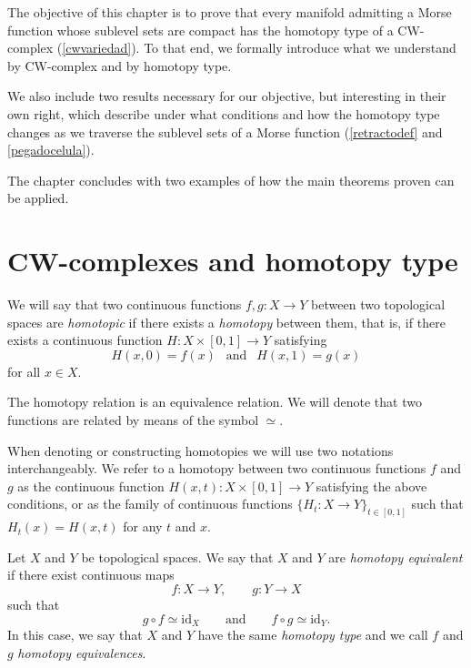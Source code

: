 
The objective of this chapter is to prove that every manifold admitting a Morse function whose sublevel sets are compact has the homotopy type of a CW-complex (\ref{cwvariedad}). To that end, we formally introduce what we understand by CW-complex and by homotopy type.

We also include two results necessary for our objective, but interesting in their own right, which describe under what conditions and how the homotopy type changes as we traverse the sublevel sets of a Morse function (\ref{retractodef} and \ref{pegadocelula}).

The chapter concludes with two examples of how the main theorems proven can be applied.

\bigskip

\section{CW-complexes and homotopy type}

We will say that two continuous functions $f, g:X\to Y$ between two topological spaces are \textit{homotopic} if there exists a \textit{homotopy} between them, that is, if there exists a continuous function $H:X\times [0,1]\to Y$ satisfying
\begin{equation*}
    H(x,0)=f(x) ~~\text{ and }~~ H(x,1)=g(x)
\end{equation*}
for all $x\in X$.

The homotopy relation is an equivalence relation. We will denote that two functions are related by means of the symbol $\simeq$.

When denoting or constructing homotopies we will use two notations interchangeably. We refer to a homotopy between two continuous functions $f$ and $g$ as the continuous function $H(x,t): X\times [0,1]\to Y$ satisfying the above conditions, or as the family of continuous functions $\{H_t: X\to Y\}_{t\in [0,1]}$ such that $H_t(x)=H(x,t)$ for any $t$ and $x$.

\medskip

\begin{definition}
Let $X$ and $Y$ be topological spaces. We say that $X$ and $Y$ are
\textit{homotopy equivalent} if there exist continuous maps
\begin{equation*}
    f: X \to Y, \qquad g: Y \to X
\end{equation*}
such that
\begin{equation*}
    g \circ f \simeq \mathrm{id}_X \qquad \text{and} \qquad f \circ g \simeq \mathrm{id}_Y.
\end{equation*}
In this case, we say that $X$ and $Y$ have the same \textit{homotopy type} and we call $f$ and $g$ \textit{homotopy equivalences}.
\end{definition}


